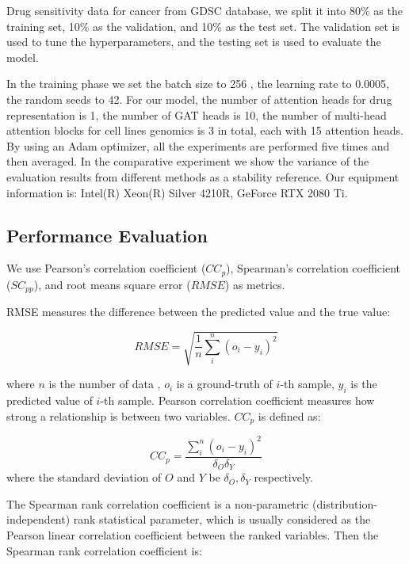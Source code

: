 \documentclass{article}
\begin{document}
Drug sensitivity data for cancer from GDSC database, we split it into 80\% as the training set, 10\% as the validation, and 10\% as the test set. The validation set is used to tune the hyperparameters, and the testing set is used to evaluate the model.  


In the training phase we set the batch size to 256 , the learning rate to 0.0005, the random seeds to 42. For our model, the number of attention heads for drug representation is 1, the number of GAT heads is 10, the number of  multi-head attention blocks for cell lines genomics is 3 in total, each with 15 attention heads. By using an Adam optimizer, all the experiments are performed five times and then averaged. In the comparative experiment we show the variance of the evaluation results from different methods as a stability reference. Our equipment information is: Intel(R) Xeon(R) Silver 4210R, GeForce RTX 2080 Ti.



\subsection{Performance Evaluation}

We use   Pearson's correlation coefficient ($CC_p$),  Spearman's correlation coefficient ($SC_{pp}$), and root means square error ($RMSE$) as metrics.
 
 RMSE measures the difference between the predicted value and the true value:

\begin{equation}
 RMSE = \sqrt{\frac{1}{n} {\textstyle \sum_{i}^{n}(o_{i} -y_{i})^{2} }  }
\end{equation}


\noindent where $n$ is the number of data , $o_i$ is a ground-truth of $i$-th sample, $y_i$ is the predicted value of $i$-th sample. Pearson correlation coefficient measures how strong a relationship is between two variables. $CC_p$ is defined as:

\begin{equation}
  CC_{p}  = \frac{ {\textstyle \sum_{i}^{n}}(o_i - y_i)^{2}   }{\delta_O \delta_Y } 
\end{equation}
\noindent where the standard deviation of $O$ and $Y$ be $\delta_O,\delta_Y$  respectively.

The Spearman rank correlation coefficient is a non-parametric (distribution-independent) rank statistical parameter, which is usually considered as the Pearson linear correlation coefficient between the ranked variables. Then the Spearman rank correlation coefficient is:
\end{document}
